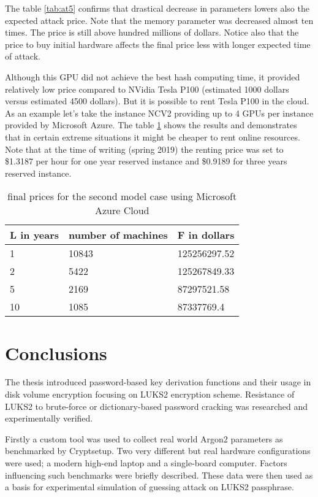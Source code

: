 \documentclass[nolof]{fithesis3}
\begin{document}
The table \ref{tab:at5} confirms that drastical decrease in parameters lowers also the expected attack price. Note that the memory parameter was decreased almost ten times. The price is still above hundred millions of dollars. Notice also that the price to buy initial hardware affects the final price less with longer expected time of attack.

Although this GPU did not achieve the best hash computing time, it provided relatively low price compared to NVidia Tesla P100 (estimated 1000  dollars versus estimated 4500 dollars). But it is possible to rent Tesla P100 in the cloud. As an example let's take the instance NCV2 providing up to 4 GPUs per instance provided by Microsoft Azure. The table \ref{tab:at6} shows the results and demonstrates that in certain extreme situations it might be cheaper to rent online resources. Note that at the time of writing (spring 2019) the renting price was set to \$1.3187 per hour for one year reserved instance and \$0.9189 for three years reserved instance.

\noindent
\begin{table}
\caption{final prices for the second model case using Microsoft Azure Cloud}
\label{tab:at6}
\begin{tabularx}{\textwidth}{| X | X | X |}
\hline
L  in years & number of machines & F in dollars\\
\hline
1 & 10843 & 125256297.52\\
\hline
2 & 5422 & 125267849.33\\
\hline
5 & 2169 & 87297521.58\\
\hline
10 & 1085 & 87337769.4\\
\hline
\end{tabularx}
\end{table}

\chapter{Conclusions}
The thesis introduced password-based key derivation functions and their usage in disk volume encryption focusing on LUKS2 encryption scheme. Resistance of LUKS2 to brute-force or dictionary-based password cracking was researched and experimentally verified.

Firstly a custom tool was used to collect real world Argon2 parameters as benchmarked by Cryptsetup. Two very different but real hardware configurations were used; a modern high-end laptop and a single-board computer. Factors influencing such benchmarks were briefly described. These data were then used as a basis for experimental simulation of guessing attack on LUKS2 passphrase.
\end{document}
